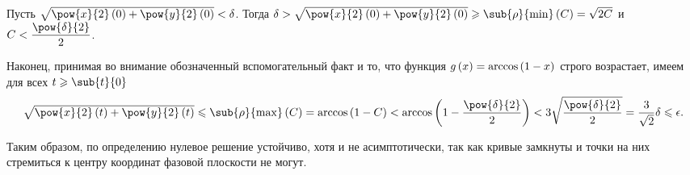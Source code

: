 \documentclass[a5paper,10pt]{article}
\begin{document}
Пусть $\sqrt{\pow{x}{2}\br{0} + \pow{y}{2}\br{0}} < \delta$. 
Тогда $\delta > \sqrt{\pow{x}{2}\br{0} + \pow{y}{2}\br{0}} \ge \sub{\rho}{\min}\br{C} = \sqrt{2C}$
и $C < \dfrac {\pow{\delta}{2}} {2}$.

Наконец, принимая во внимание обозначенный вспомогательный факт и то, что функция 
$g\left(\hspace{0.01em}x\hspace{0.01em}\right) = \arccos\left(\hspace{0.01em}1 - x\hspace{0.01em}\right)$ строго возрастает, имеем для всех $t \ge \sub{t}{0}$
$$\textstyle\sqrt{\pow{x}{2}\br{t} + \pow{y}{2}\br{t}}\displaystyle
    \le \sub{\rho}{\max}\br{C}
    = \arccos\br{1 - C}
    < \arccos\br{1 - \frac {\pow{\delta}{2}} {2}}
    < 3 \sqrt{\frac{\pow{\delta}{2}} {2}}
    = \frac {3} {\sqrt{2}}\delta
    \le \epsilon.$$

Таким образом, по определению нулевое решение устойчиво, хотя и не асимптотически,
так как кривые замкнуты и точки на них стремиться к центру координат фазовой плоскости не могут.
\end{document}

